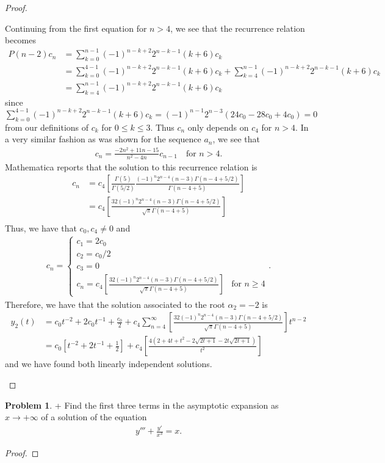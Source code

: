 \documentclass[12pt]{article}
\theoremstyle{definition}
\newtheorem{problem}{Problem}
\begin{document}
\begin{proof}
\begin{enumerate}
      Continuing from the first equation for $n>4$, we see that the recurrence relation becomes
      \begin{align*}
        P(n - 2)c_n &= \sum_{k=0}^{n-1} (-1)^{n-k+2}2^{n-k-1}(k+6)c_k \\
        &= \sum_{k=0}^{4-1} (-1)^{n-k+2}2^{n-k-1}(k+6)c_k + \sum_{k=4}^{n-1} (-1)^{n-k+2}2^{n-k-1}(k+6)c_k\\
        &= \sum_{k=4}^{n-1} (-1)^{n-k+2}2^{n-k-1}(k+6)c_k
      \end{align*}
      since $\sum_{k=0}^{4-1} (-1)^{n-k+2}2^{n-k-1}(k+6)c_k = (-1)^{n-1}2^{n-3}(24c_0 - 28c_0 + 4 c_0) = 0$ from our definitions of
      $c_k$ for $0\leq k \leq 3$. Thus $c_n$ only depends on $c_4$ for $n>4$.
      In a very similar fashion as was shown for the sequence $a_n$, we see that
      \begin{align*}
        c_n = \frac{-2n^2 +11n-15}{n^2-4n}c_{n-1} \quad \text{for $n > 4$}.
      \end{align*}
      Mathematica reports that the solution to this recurrence relation
      is
      \begin{align*}
        c_n &= c_4\left[\frac{\Gamma(5)}{\Gamma(5/2)}\frac{(-1)^n 2^{n-4}(n-3)\Gamma(n-4+5/2)}{\Gamma(n-4+5)}\right] \\
        &= c_4\left[\frac{32(-1)^n 2^{n-4}(n-3)\Gamma(n-4+5/2)}{\sqrt{\pi}\Gamma(n-4+5)}\right] \\
      \end{align*}
      Thus, we have that $c_0, c_4 \neq 0$ and
      \begin{align*}
        c_n =
        \begin{cases}
          c_1 = 2c_0& \\
          c_2 = c_0/2&\\
          c_3 = 0&\\
          c_n = c_4\left[\frac{32(-1)^n 2^{n-4}(n-3)\Gamma(n-4+5/2)}{\sqrt{\pi}\Gamma(n-4+5)}\right] & \text{for $n\geq 4$}
        \end{cases}.
      \end{align*}
      Therefore, we have that the solution associated to the root $\alpha_2 = -2$ is
      \begin{align*}
        y_2(t) &= c_0t^{-2} + 2c_0 t^{-1} + \frac{c_0}{2} + c_4\sum_{n=4}^\infty\left[\frac{32(-1)^n 2^{n-4}(n-3)\Gamma(n-4+5/2)}{\sqrt{\pi}\Gamma(n-4+5)}\right]t^{n-2} \\
        &= c_0\left[t^{-2} + 2t^{-1} + \frac{1}{2}\right] + c_4 \left[\frac{4(2+4t+t^2-2\sqrt{2t+1}-2t\sqrt{2t+1})}{t^2}\right]
      \end{align*}
      and we have found both linearly independent solutions.
  \end{enumerate}
\end{proof}
\newpage


\begin{problem}+
  Find the first three terms in the asymptotic expansion as $x \to +\infty$
  of a solution of the equation
  \begin{align*}
    y''' + \frac{y'}{x^3} = x.
  \end{align*}
\end{problem}

\begin{proof}
\end{proof}
\end{document}
